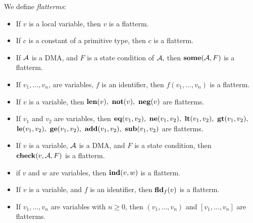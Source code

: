 \begin{definition}
   \label{Def_flatterm}
   We define \emph{flatterms}:
   \begin{itemize}
   \item
      If $ v $ is a local variable, then $ v $ is a flatterm.
   \item
      If $ c $ is a constant of a primitive type,
      then $ c $ is a flatterm.
   \item
      If $ {\cal A} $ is a DMA, and $ F $ is a state
      condition of $ {\cal A}, $ then $ {\bf some}({\cal A}, F ) $ is
      a flatterm.
   \item
      If $ v_1, \ldots, v_n $, are variables, $ f $ is an identifier,
      then $ f(v_1, \ldots, v_n) $ is a flatterm.
   \item
      If $ v $ is a variable, then
      $ {\bf len}(v), \ {\bf not}(v), \ {\bf neg}(v) $ 
      are flatterms.
   \item
      If $ v_1 $ and $ v_2 $ are variables,
      then 
      $ {\bf eq}(v_1,v_2), \ {\bf ne}(v_1,v_2), \
         {\bf lt}(v_1,v_2), \ {\bf gt}(v_1,v_2), $ \\
      $ {\bf le}(v_1,v_2), \ {\bf ge}(v_1,v_2), \
        {\bf add}(v_1,v_2), \ {\bf sub}(v_1,v_2)  $
      are flatterms.
  \item
      If $ v $ is a variable,
      $ {\cal A} $ is a DMA, and $ F $ is a state condition, then
      $ {\bf check}( v, {\cal A}, F ) $ is a flatterm.
   \item
          if $ v $ and $ w $ are variables,
          then $ {\bf ind}(v,w) $ is a flatterm.
   \item
      If $ v $ is a variable, and $ f $ is an identifier,
      then $ {\bf fld}_f(v) $ is a flatterm.
   \item
      If $ v_1, \ldots, v_n $ are variables with $ n \geq 0 $,
          then $ ( v_1, \ldots, v_n ) $ and
                   $ [ v_1, \ldots, v_n ] $ are flatterms.
   \end{itemize}
\end{definition}

